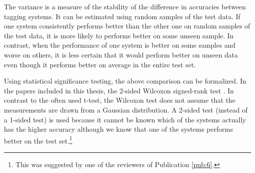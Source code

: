 The variance is a measure of the stability of the difference in
accuracies between tagging systems. It can be estimated using random
samples of the test data. If one system consistently performs better
than the other one on random samples of the test data, it is more
likely to performs better on some unseen sample. In contrast, when the
performance of one system is better on some samples and worse on
others, it is less certain that it would perform better on unseen data
even though it performs better on average in the entire test set.

Using statistical significance testing, the above comparison can be
formalized. In the papers included in this thesis, the 2-sided
Wilcoxon signed-rank test \citep{Wilcoxon45}. In contrast to the often
used t-test, the Wilcoxon test does not assume that the measurements
are drawn from a Gaussian distribution. A 2-sided test (instead of a
1-sided test) is used because it cannot be known which of the systems
actually has the higher accuracy although we know that one of the
systems performs better on the test set.\footnote{This was suggested
  by one of the reviewers of Publication \ref{pub:6}.}

